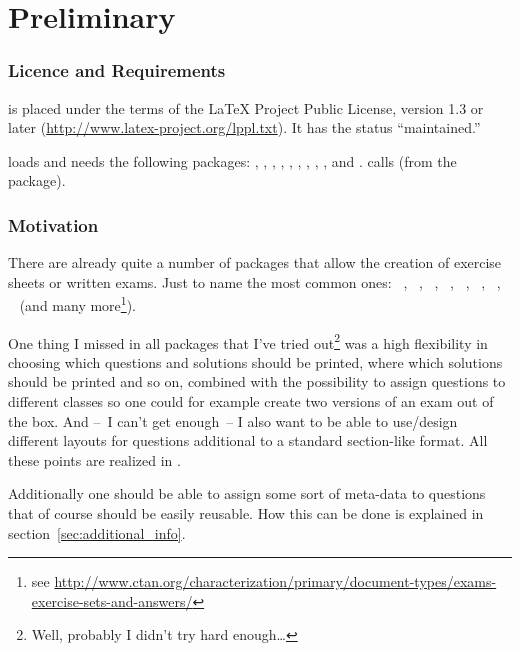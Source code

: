 \documentclass[DIV10,toc=index,toc=bib,numbers=noendperiod]{cnpkgdoc}
\begin{document}
\part{Preliminary}
\section{Licence and Requirements}
\ExSheets is placed under the terms of the \LaTeX{} Project Public License,
version 1.3 or later (\url{http://www.latex-project.org/lppl.txt}).  It has
the status ``maintained.''

\ExSheets loads and needs the following packages: ,
, , , ,
, , , , and
.  \ExSheets calls  (from the 
package).

\section{Motivation}
There are already quite a number of packages that allow the creation of
exercise sheets or written exams.  Just to name the most common ones:
~\cite{eqexam}, ~\cite{exam},
~\cite{examdesign}, ~\cite{exercise},
~\cite{probsoln}, ~\cite{answers},
~\cite{esami}, ~\cite{exsol} (and many
more\footnote{see
  \url{http://www.ctan.org/characterization/primary/document-types/exams-exercise-sets-and-answers/}}).

One thing I missed in all packages that I've tried out\footnote{Well, probably
  I didn't try hard enough\ldots} was a high flexibility in choosing which
questions and solutions should be printed, where which solutions should be
printed and so on, combined with the possibility to assign questions to
different classes so one could for example create two versions of an exam out
of the box.  And --~I can't get enough~-- I also want to be able to use/design
different layouts for questions additional to a standard section-like format.
All these points are realized in \ExSheets.

Additionally one should be able to assign some sort of meta-data to questions
that of course should be easily reusable.  How this can be done is explained
in section~\ref{sec:additional_info}.
\end{document}

